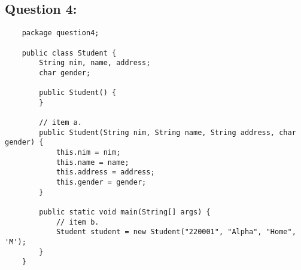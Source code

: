 \documentclass[12pt,titlepage]{article}
\begin{document}
\subsection*{Question 4:}
\noindent
\begin{verbatim}
    package question4;

    public class Student {
        String nim, name, address;
        char gender;

        public Student() {
        }

        // item a.
        public Student(String nim, String name, String address, char gender) {
            this.nim = nim;
            this.name = name;
            this.address = address;
            this.gender = gender;
        }

        public static void main(String[] args) {
            // item b.
            Student student = new Student("220001", "Alpha", "Home", 'M');
        }
    }
\end{verbatim}

\newpage
\end{document}
